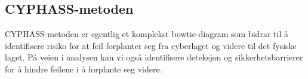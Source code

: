 \subsection{CYPHASS-metoden}

CYPHASS-metoden er egentlig et komplekst bowtie-diagram som bidrar til å identifisere risiko for at feil forplanter seg fra cyberlaget og videre til det fysiske laget. På veien i analysen kan vi også identifisere deteksjon og sikkerhetsbarrierer for å hindre feilene i å forplante seg videre.
